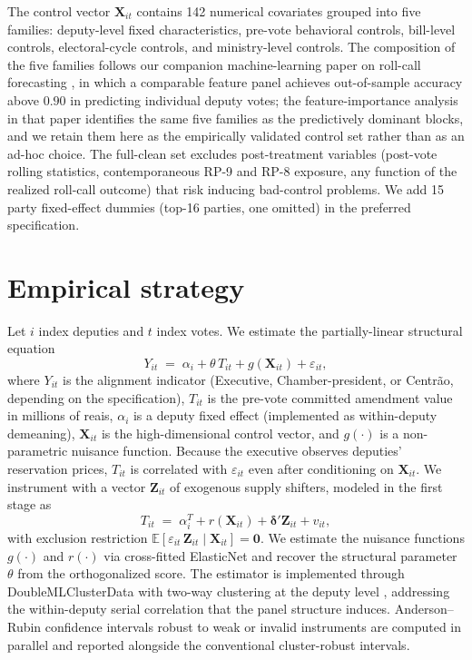 \documentclass[preprint,12pt,authoryear]{elsarticle}
\begin{document}
The control vector $\mathbf{X}_{it}$ contains 142 numerical covariates grouped into five families: deputy-level fixed characteristics, pre-vote behavioral controls, bill-level controls, electoral-cycle controls, and ministry-level controls. The composition of the five families follows our companion machine-learning paper on roll-call forecasting \citep{CampeloCajueiro2025}, in which a comparable feature panel achieves out-of-sample accuracy above $0.90$ in predicting individual deputy votes; the feature-importance analysis in that paper identifies the same five families as the predictively dominant blocks, and we retain them here as the empirically validated control set rather than as an ad-hoc choice. The full-clean set excludes post-treatment variables (post-vote rolling statistics, contemporaneous RP-9 and RP-8 exposure, any function of the realized roll-call outcome) that risk inducing bad-control problems. We add 15 party fixed-effect dummies (top-16 parties, one omitted) in the preferred specification.

\section{Empirical strategy}
\label{sec:strategy}

Let $i$ index deputies and $t$ index votes. We estimate the partially-linear structural equation
\begin{equation}
Y_{it} \;=\; \alpha_i + \theta\, T_{it} + g(\mathbf{X}_{it}) + \varepsilon_{it},
\label{eq:y}
\end{equation}
where $Y_{it}$ is the alignment indicator (Executive, Chamber-president, or Centr\~ao, depending on the specification), $T_{it}$ is the pre-vote committed amendment value in millions of reais, $\alpha_i$ is a deputy fixed effect (implemented as within-deputy demeaning), $\mathbf{X}_{it}$ is the high-dimensional control vector, and $g(\cdot)$ is a non-parametric nuisance function. Because the executive observes deputies' reservation prices, $T_{it}$ is correlated with $\varepsilon_{it}$ even after conditioning on $\mathbf{X}_{it}$. We instrument with a vector $\mathbf{Z}_{it}$ of exogenous supply shifters, modeled in the first stage as
\begin{equation}
T_{it} \;=\; \alpha_i^{T} + r(\mathbf{X}_{it}) + \boldsymbol\delta'\mathbf{Z}_{it} + v_{it},
\label{eq:t}
\end{equation}
with exclusion restriction $\mathbb{E}[\varepsilon_{it}\,\mathbf{Z}_{it} \mid \mathbf{X}_{it}] = \mathbf{0}$. We estimate the nuisance functions $g(\cdot)$ and $r(\cdot)$ via cross-fitted ElasticNet \citep{Chernozhukov2018} and recover the structural parameter $\theta$ from the orthogonalized score. The estimator is implemented through DoubleMLClusterData with two-way clustering at the deputy level \citep{CameronGelbachMiller2011}, addressing the within-deputy serial correlation that the panel structure induces. Anderson--Rubin confidence intervals \citep{AndersonRubin1949} robust to weak or invalid instruments are computed in parallel and reported alongside the conventional cluster-robust intervals.
\end{document}
